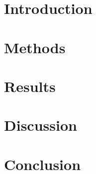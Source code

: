 \documentclass[11pt,titlepage]{report}
\begin{document}
\chapter{Introduction}


\chapter{Methods}


\chapter{Results}


\chapter{Discussion}


\chapter{Conclusion}


\clearpage
\pagestyle{numberonly}

\printbibliography
\end{document}
